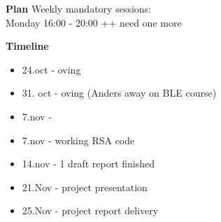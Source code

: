 \textbf{Plan}
Weekly mandatory sessions: \\
Monday 16:00 - 20:00
++ need one more




\textbf{Timeline}
\begin{itemize}
\setlength\itemsep{0em}
    \item 24.oct - oving
    \item 31. oct - oving (Anders away on BLE course)
    \item 7.nov - 
    \item 7.nov - working RSA code
    \item 14.nov - 1 draft report finished
    \item 21.Nov - project presentation
    \item 25.Nov - project report delivery
\end{itemize}




